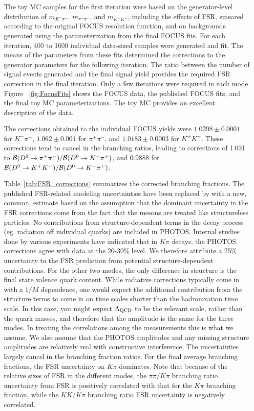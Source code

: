 The toy MC samples for the first iteration were based on the generator-level 
distribution of $m_{K^-\pi^+}$, $m_{\pi^+\pi^-}$, and $m_{K^+K^-}$, including 
the effects of FSR, smeared according to the original FOCUS resolution 
function,  and on backgrounds 
generated 
using the parameterization from the final
FOCUS fits.  For each iteration, 400 to 1600 individual 
data-sized samples were 
generated 
and fit. The means of the parameters from these fits determined the 
corrections to the generator parameters for the following iteration.  The 
ratio between the number of signal events generated and the final signal 
yield provides the required FSR correction in the final iteration.  Only a 
few iterations were required in each mode.  Figure ~\ref{fig:FocusFits} 
shows the FOCUS data, the published FOCUS fits, and the final toy MC 
parameterizations.  The toy MC provides an excellent description of the 
data.

The corrections obtained to the individual FOCUS yields were 
$1.0298\pm 0.0001$ for $K^-\pi^+$, $1.062 \pm 0.001$ for $\pi^+\pi^-$, 
and $1.0183 \pm 0.0003$ for $K^+K^-$.  These corrections tend to cancel 
in the branching ratios, leading to corrections of 1.031 to  
${\cal B}(D^0\to \pi^+\pi^-)/{\cal B}(D^0\to K^-\pi^+)$, and 0.9888 for 
${\cal B}(D^0\to K^+ K^-)/{\cal B}(D^0\to K^-\pi^+)$.

Table~\ref{tab:FSR_corrections} summarizes the corrected branching fractions. 
The published FSR-related modeling uncertainties have been replaced by with a
new, common, estimate based on the assumption that the dominant uncertainty 
in the FSR corrections come from the fact that the mesons are treated like 
structureless particles. No contributions from structure-dependent terms in 
the decay process (eg. radiation off individual quarks) are included in PHOTOS. 
Internal studies done by various experiments have indicated that 
in $K\pi$ decays, 
the PHOTOS corrections agree with data at the 20-30\% level. 
We therefore attribute a 25\% uncertainty to the FSR prediction from potential 
structure-dependent contributions. For the other two modes, the only difference 
in structure is the final state valence quark content. While radiative corrections 
typically come in with a $1/M$ dependence, one would expect the additional 
contribution from the structure terms to come in on time scales shorter than 
the hadronization time scale. In this case, you might expect
$\rm \Lambda_{\rm QCD}$ to be the relevant scale, rather than the quark masses,
and therefore that the amplitude is the same for the three modes. In treating
the correlations among the measurements this is what we assume. We also assume
that the PHOTOS amplitudes and any missing structure amplitudes are relatively 
real with constructive interference.  The uncertainties largely cancel 
in the branching fraction ratios. For the final average branching 
fractions, the FSR uncertainty on $K\pi$ dominates. Note that because 
of the relative sizes of FSR in the different modes, the $\pi\pi/K\pi$ 
branching ratio uncertainty from FSR is 
positively correlated with that 
for the $K\pi$ branching fraction, while the $KK/K\pi$ branching ratio FSR
uncertainty is negatively correlated.

